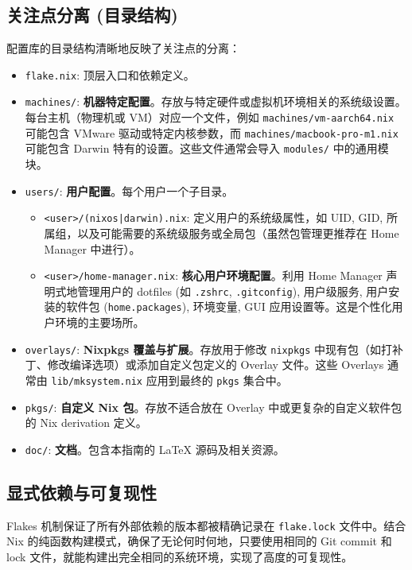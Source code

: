\documentclass[11pt, a4paper]{article} %
\begin{document}
\subsection{关注点分离 (目录结构)}
配置库的目录结构清晰地反映了关注点的分离：
    \begin{itemize}[leftmargin=*]
        \item \texttt{flake.nix}: 顶层入口和依赖定义。
        \item \texttt{machines/}: \textbf{机器特定配置}。存放与特定硬件或虚拟机环境相关的系统级设置。每台主机（物理机或 VM）对应一个文件，例如 \texttt{machines/vm-aarch64.nix} 可能包含 VMware 驱动或特定内核参数，而 \texttt{machines/macbook-pro-m1.nix} 可能包含 Darwin 特有的设置。这些文件通常会导入 \texttt{modules/} 中的通用模块。
        \item \texttt{users/}: \textbf{用户配置}。每个用户一个子目录。
            \begin{itemize}
                \item \texttt{<user>/(nixos|darwin).nix}: 定义用户的系统级属性，如 UID, GID, 所属组，以及可能需要的系统级服务或全局包（虽然包管理更推荐在 Home Manager 中进行）。
                \item \texttt{<user>/home-manager.nix}: \textbf{核心用户环境配置}。利用 Home Manager 声明式地管理用户的 dotfiles (如 \texttt{.zshrc}, \texttt{.gitconfig}), 用户级服务, 用户安装的软件包 (\texttt{home.packages}), 环境变量, GUI 应用设置等。这是个性化用户环境的主要场所。
            \end{itemize}
        \item \texttt{overlays/}: \textbf{Nixpkgs 覆盖与扩展}。存放用于修改 \texttt{nixpkgs} 中现有包（如打补丁、修改编译选项）或添加自定义包定义的 Overlay 文件。这些 Overlays 通常由 \texttt{lib/mksystem.nix} 应用到最终的 \texttt{pkgs} 集合中。
        \item \texttt{pkgs/}: \textbf{自定义 Nix 包}。存放不适合放在 Overlay 中或更复杂的自定义软件包的 Nix derivation 定义。
        \item \texttt{doc/}: \textbf{文档}。包含本指南的 LaTeX 源码及相关资源。
    \end{itemize}

\subsection{显式依赖与可复现性}
Flakes 机制保证了所有外部依赖的版本都被精确记录在 \texttt{flake.lock} 文件中。结合 Nix 的纯函数构建模式，确保了无论何时何地，只要使用相同的 Git commit 和 lock 文件，就能构建出完全相同的系统环境，实现了高度的可复现性。
\end{document}
